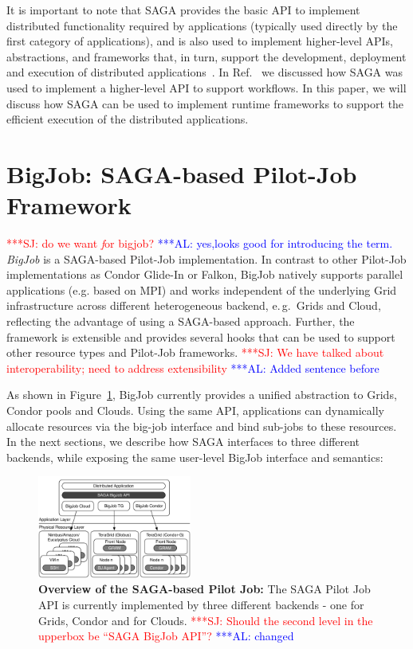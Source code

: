 \documentclass[conference,final]{IEEEtran}
\newcommand{\up}{\vspace*{-1em}}
\newcommand{\alnote}[1]{ {\textcolor{blue} { ***AL: #1 }}}
\newcommand{\jhanote}[1]{ {\textcolor{red} { ***SJ: #1 }}}
\newcommand{\alnote}[1]{}
\newcommand{\jhanote}[1]{}
\begin{document}
It is important to note that SAGA provides the basic API to implement
distributed functionality required by applications (typically used
directly by the first category of applications), and is also used to
implement higher-level APIs, abstractions, and frameworks that, in
turn, support the development, deployment and execution of distributed
applications~\cite{enkf-gmac09}. In Ref.~\cite{sagamontage09} we
discussed how SAGA was used to implement a higher-level API to support
workflows. In this paper, we will discuss how SAGA can be used to
implement runtime frameworks to support the efficient execution of the
distributed applications.

\up
\section{BigJob: SAGA-based Pilot-Job Framework}
\up

\jhanote{do we want \emph for bigjob?} \alnote{yes,looks good for introducing the term.}
\emph{BigJob} is a SAGA-based Pilot-Job implementation. In contrast to
other Pilot-Job implementations as Condor Glide-In or Falkon, BigJob
natively supports parallel applications (e.g. based on MPI) and works
independent of the underlying Grid infrastructure across different
heterogeneous backend, e.\,g.\ Grids and Cloud, reflecting the
advantage of using a SAGA-based approach. Further, the framework is 
extensible and provides several hooks that can be used to support
other resource types and Pilot-Job frameworks.
\jhanote{We have talked about interoperability; need to address extensibility} 
\alnote{Added sentence before}

As shown in Figure~\ref{fig:figures_distributed_pilot_job}, BigJob currently
provides a unified abstraction to Grids, Condor pools and
Clouds. Using the same API, applications can dynamically allocate
resources via the big-job interface and bind sub-jobs to these
resources. In the next sections, we describe how SAGA interfaces to
three different backends, while exposing the same user-level BigJob interface
and semantics:

\begin{figure}[htbp]
    \centering
        \includegraphics[width=0.45\textwidth]{figures/distributed_pilot_job}
        \caption{\textbf{Overview of the SAGA-based Pilot Job:} The
          SAGA Pilot Job API is currently implemented by three
          different backends - one for Grids, Condor and for
          Clouds. \jhanote{Should the second level in the upperbox be
            ``SAGA BigJob API''?}\alnote{changed}}
    \label{fig:figures_distributed_pilot_job}
\end{figure}
\end{document}
